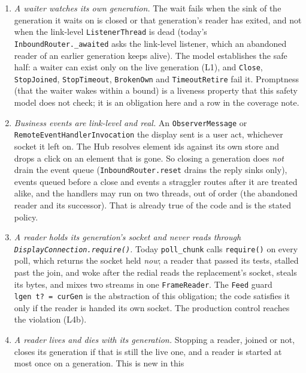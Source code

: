 \documentclass[a4paper,10pt,fleqn]{article}
\begin{document}
\begin{enumerate}
    (DES-090, cross-host), they cannot be pinned, and the alternative is a
    request id on the wire (see Options, below).
  \item \emph{A waiter watches its own generation.}  The wait fails when the
    sink of the generation it waits on is closed or that generation's reader
    has exited, and not when the link-level \texttt{ListenerThread} is dead
    (today's \texttt{InboundRouter.\_awaited} asks the link-level listener,
    which an abandoned reader of an earlier generation keeps alive).  The
    model establishes the safe half: a waiter can exist only on the live
    generation (L1), and \texttt{Close}, \texttt{StopJoined},
    \texttt{StopTimeout}, \texttt{BrokenOwn} and \texttt{TimeoutRetire} fail
    it.  Promptness (that the waiter wakes within a bound) is a liveness
    property that this safety model does not check; it is an obligation here
    and a row in the coverage note.
  \item \emph{Business events are link-level and real.}  An
    \texttt{ObserverMessage} or \texttt{RemoteEventHandlerInvocation} the
    display sent is a user act, whichever socket it left on.  The Hub resolves
    element ids against its own store and drops a click on an element that is
    gone.  So closing a generation does \emph{not} drain the event queue
    (\texttt{InboundRouter.reset} drains the reply sinks only), events queued
    before a close and events a straggler routes after it are treated alike,
    and the handlers may run on two threads, out of order (the abandoned reader
    and its successor).  That is already true of the code and is the stated
    policy.
  \item \emph{A reader holds its generation's socket and never reads through
    \texttt{DisplayConnection.require()}.}  Today \texttt{poll\_chunk} calls
    \texttt{require()} on every poll, which returns the socket held \emph{now};
    a reader that passed its tests, stalled past the join, and woke after the
    redial reads the replacement's socket, steals its bytes, and mixes two
    streams in one \texttt{FrameReader}.  The \texttt{Feed} guard
    \texttt{lgen~t? = curGen} is the abstraction of this obligation; the
    code satisfies it only if the reader is handed its own socket.  The
    production control reaches the violation (L4b).
  \item \emph{A reader lives and dies with its generation.}  Stopping a reader,
    joined or not, closes its generation if that is still the live one, and a
    reader is started at most once on a generation.  This is new in this

\end{enumerate}
\end{document}
